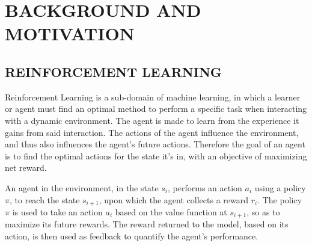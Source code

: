 
\chapter{BACKGROUND AND MOTIVATION} %
%

\section{REINFORCEMENT LEARNING}

\im

Reinforcement Learning is a sub-domain of machine learning, in which a learner or agent must find an optimal method to perform a specific task when interacting with a dynamic environment. The agent is made to learn from the experience it gains from said interaction. The actions of the agent influence the environment, and thus also influences the agent's future actions. Therefore the goal of an agent is to find the optimal actions for the state it's in, with an objective of maximizing net reward.
%

An agent in the environment, in the state $s_{i} $, performs an action $a_{i} $ using a policy $\pi$, to reach the state $s_{i+1} $, upon which the agent collects a reward $r_{i} $. The policy $\pi$ is used to take an action $a_{i} $ based on the value function at $s_{i+1} $, so as to maximize its future rewards. The reward returned to the model, based on its action, is then used as feedback to quantify the agent's performance.


%

